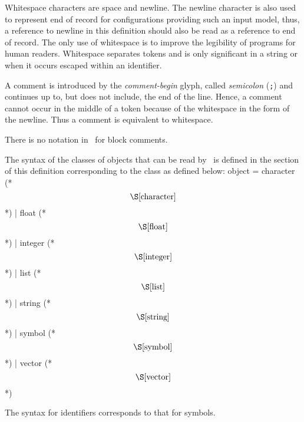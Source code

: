 %
\begin{optDefinition}
Whitespace characters are space and
newline.  The newline character is also used to represent end of record for
configurations providing such an input model, thus, a reference to newline in
this definition should also be read as a reference to end of record.  The only
use of whitespace is to improve the legibility of programs for human readers.
Whitespace separates tokens and is only significant in a string or when it
occurs escaped within an identifier.

A comment is introduced by the {\em
    comment-begin} glyph,
called {\em semicolon} (\verb+;+) and continues up to, but does not include, the
end of the line.  Hence, a comment cannot occur in the middle of a token because
of the whitespace in the form of the newline.  Thus a comment is equivalent to
whitespace.
%
\begin{note}
    There is no notation in \eulisp\ for block comments.
\end{note}
\end{optDefinition}
%
\begin{optDefinition}
The syntax of the classes of objects that can be read by \eulisp\ is defined in
the section of this definition corresponding to the class as defined below:
%
\Syntax
\label{object-syntax}
\savesyntax\objectSyntax\vbox{\small\syntax
object
    = character (* \[\S\ref{character}\] *)
    | float (* \[\S\ref{float}\] *)
    | integer (* \[\S\ref{integer}\] *)
    | list (* \[\S\ref{list}\] *)
    | string (* \[\S\ref{string}\] *)
    | symbol (* \[\S\ref{symbol}\] *)
    | vector (* \[\S\ref{vector}\] *)
\endsyntax}

The syntax for identifiers 
 corresponds to that for symbols.
%
\end{optDefinition}
